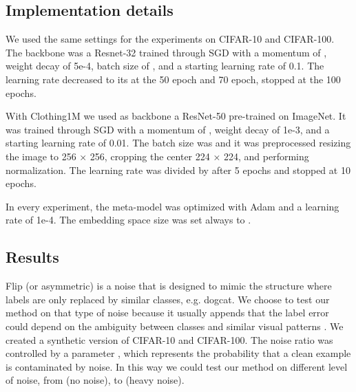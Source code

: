 \documentclass[runningheads]{llncs}
\begin{document}
	\subsection{Implementation details}
	
	We used the same settings for the experiments on CIFAR-10 and CIFAR-100. The backbone was a Resnet-32 trained through SGD with a momentum of , weight decay of 5e-4, batch size of , and a starting learning rate of 0.1. The learning rate decreased to its  at the 50 epoch and 70 epoch, stopped at the 100 epochs.
	
	With Clothing1M we used as backbone a ResNet-50 pre-trained on ImageNet. It was trained through SGD with a momentum of , weight decay of 1e-3, and a starting learning rate of 0.01. The batch size was  and it was preprocessed resizing the image to 256 × 256, cropping the center 224 × 224, and performing normalization. The learning rate was divided by  after 5 epochs and stopped at 10 epochs.
	
	In every experiment, the meta-model was optimized with Adam and a learning rate of 1e-4. The embedding space size was set always to .
	
	\subsection{Results}\label{noise}
	
		Flip (or asymmetric) is a noise that is designed to mimic the structure where labels are only replaced by similar classes, e.g. dogcat. We choose to test our method on that type of noise because it usually appends that the label error could depend on the ambiguity between classes and similar visual patterns \cite{xiao2015learning}. We created a synthetic version of CIFAR-10 and CIFAR-100. The noise ratio was controlled by a parameter , which represents the probability that a clean example is contaminated by noise. In this way we could test our method on different level of noise, from  (no noise), to  (heavy noise).
	
\end{document}
